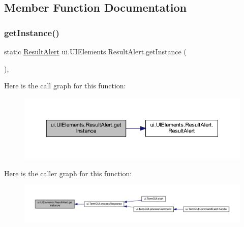 \subsection{Member Function Documentation}
\mbox{\label{classui_1_1_u_i_elements_1_1_result_alert_ae42b2e0b388584d71db12f4a5798a684}} 
\subsubsection{\texorpdfstring{get\+Instance()}{getInstance()}}
{\footnotesize\ttfamily static \mbox{\hyperlink{classui_1_1_u_i_elements_1_1_result_alert}{Result\+Alert}} ui.\+U\+I\+Elements.\+Result\+Alert.\+get\+Instance (\begin{DoxyParamCaption}{ }\end{DoxyParamCaption})\hspace{0.3cm}{\ttfamily [inline]}, {\ttfamily [static]}}

Here is the call graph for this function\+:
\nopagebreak
\begin{figure}[H]
\begin{center}
\leavevmode
\includegraphics[width=350pt]{classui_1_1_u_i_elements_1_1_result_alert_ae42b2e0b388584d71db12f4a5798a684_cgraph}
\end{center}
\end{figure}
Here is the caller graph for this function\+:
\nopagebreak
\begin{figure}[H]
\begin{center}
\leavevmode
\includegraphics[width=350pt]{classui_1_1_u_i_elements_1_1_result_alert_ae42b2e0b388584d71db12f4a5798a684_icgraph}
\end{center}
\end{figure}
\mbox{\label{classui_1_1_u_i_elements_1_1_result_alert_ac15ce87d85f7eb1b88aa3ae6f8d6b8e9}} 
